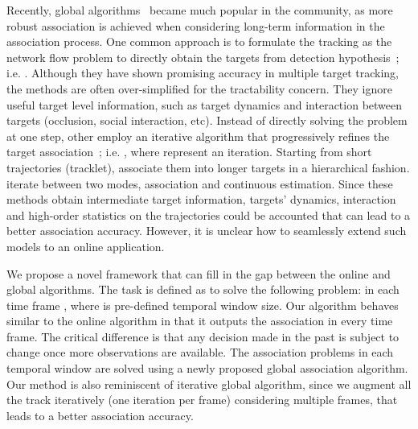\documentclass[10pt,twocolumn,letterpaper]{article}
\begin{document}
Recently, global algorithms~\cite{Andriyenko:2012:DCO,BerclazFTF11,Milan:2014:CEM,Pirsiavash_CVPR_11,Zhang_CVPR_08} became much popular in the community, as more robust association is achieved when considering long-term information in the association process. One common approach is to formulate the tracking as the network flow problem to directly obtain the targets from detection hypothesis~\cite{BerclazFTF11,Pirsiavash_CVPR_11,Zhang_CVPR_08}; i.e. . Although they have shown promising accuracy in multiple target tracking, the methods are often over-simplified for the tractability concern. They ignore useful target level information, such as target dynamics and interaction between targets (occlusion, social interaction, etc). Instead of directly solving the problem at one step, other employ an iterative algorithm that progressively refines the target association~\cite{Andriyenko:2012:DCO,huang2008robust,Kuo_CVPR_10,Milan:2014:CEM}; i.e. , where  represent an iteration. Starting from short trajectories (tracklet), \cite{huang2008robust,Kuo_CVPR_10} associate them into longer targets in a hierarchical fashion. \cite{Andriyenko:2012:DCO,Milan:2014:CEM} iterate between two modes, association and continuous estimation. Since these methods obtain intermediate target information, targets' dynamics, interaction and high-order statistics on the trajectories could be accounted that can lead to a better association accuracy. However, it is unclear how to seamlessly extend such models to an online application.

We propose a novel framework that can fill in the gap between the online and global algorithms. The task is defined as to solve the following problem:  in each time frame , where  is pre-defined temporal window size. Our algorithm behaves similar to the online algorithm in that it outputs the association in every time frame. 
The critical difference is that any decision made in the past is subject to change once more observations are available. The association problems in each temporal window are solved using a newly proposed global association algorithm. Our method is also reminiscent of iterative global algorithm, since we augment all the track iteratively (one iteration per frame) considering multiple frames, that leads to a better association accuracy. 
\end{document}
